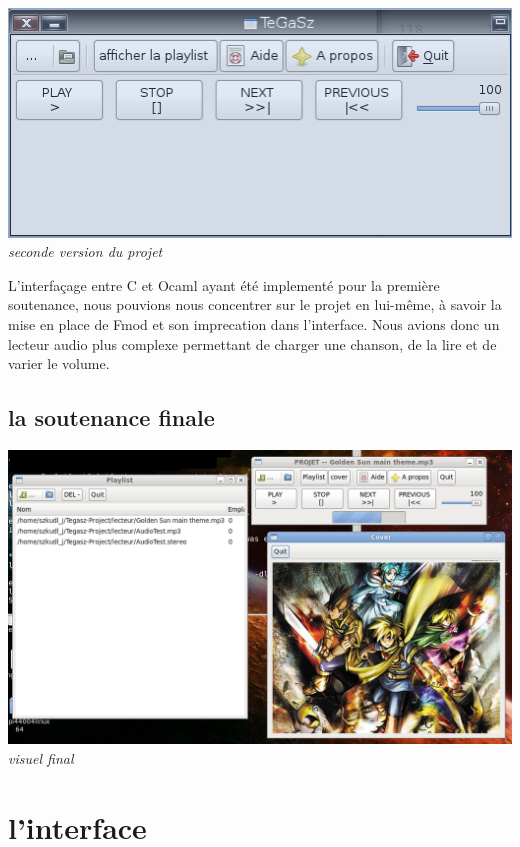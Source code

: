 \documentclass[12pt,a4paper]{report}
\begin{document}
\begin{center}
\includegraphics[scale = 0.8]{interface2.png}
\it{ seconde version du projet}
\end{center}


L'interfaçage entre C et Ocaml ayant été implementé pour la première soutenance,  nous pouvions nous concentrer sur le projet en lui-même, à savoir la mise en place de Fmod et son imprecation dans l'interface.
Nous avions donc un lecteur audio plus complexe permettant de charger une chanson, de la lire et de varier le volume.

\section{la soutenance finale}

\begin{center}
\includegraphics[scale = 0.4]{interface3.png}
\it{visuel final}
\end{center}

\chapter{l'interface}
\end{document}
